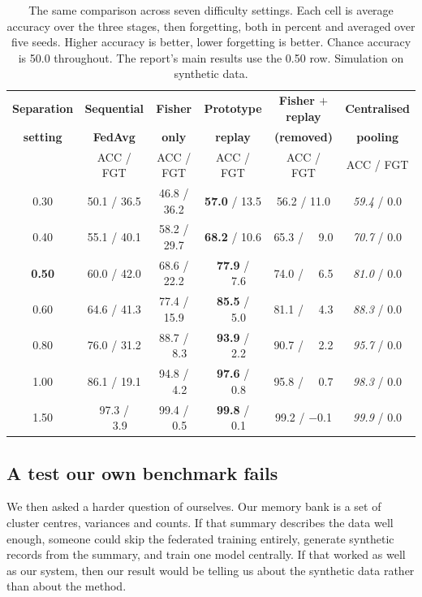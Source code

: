 \documentclass[11pt,a4paper]{article}
\begin{document}
\begin{table}[htbp]
\centering
\caption{The same comparison across seven difficulty settings. Each cell is
average accuracy over the three stages, then forgetting, both in percent and
averaged over five seeds. Higher accuracy is better, lower forgetting is better.
Chance accuracy is 50.0 throughout. The report's main results use the 0.50 row.
Simulation on synthetic data.}
\label{tab:sweep}
\small
\begin{tabular}{@{}c ccccc@{}}
\toprule
\textbf{Separation} & \textbf{Sequential} & \textbf{Fisher} &
\textbf{Prototype} & \textbf{Fisher $+$ replay} & \textbf{Centralised} \\
\textbf{setting} & \textbf{FedAvg} & \textbf{only} & \textbf{replay} &
\textbf{(removed)} & \textbf{pooling} \\
 & ACC / FGT & ACC / FGT & ACC / FGT & ACC / FGT & ACC / FGT \\
\midrule
0.30          & 50.1 / 36.5 & 46.8 / 36.2 & \textbf{57.0} / 13.5 & 56.2 / 11.0 & \textit{59.4} / 0.0 \\
0.40          & 55.1 / 40.1 & 58.2 / 29.7 & \textbf{68.2} / 10.6 & 65.3 / \ \ 9.0 & \textit{70.7} / 0.0 \\
\textbf{0.50} & 60.0 / 42.0 & 68.6 / 22.2 & \textbf{77.9} / \ \ 7.6 & 74.0 / \ \ 6.5 & \textit{81.0} / 0.0 \\
0.60          & 64.6 / 41.3 & 77.4 / 15.9 & \textbf{85.5} / \ \ 5.0 & 81.1 / \ \ 4.3 & \textit{88.3} / 0.0 \\
0.80          & 76.0 / 31.2 & 88.7 / \ \ 8.3 & \textbf{93.9} / \ \ 2.2 & 90.7 / \ \ 2.2 & \textit{95.7} / 0.0 \\
1.00          & 86.1 / 19.1 & 94.8 / \ \ 4.2 & \textbf{97.6} / \ \ 0.8 & 95.8 / \ \ 0.7 & \textit{98.3} / 0.0 \\
1.50          & 97.3 / \ \ 3.9 & 99.4 / \ \ 0.5 & \textbf{99.8} / \ \ 0.1 & 99.2 / $-$0.1 & \textit{99.9} / 0.0 \\
\bottomrule
\end{tabular}
\end{table}

\subsection{A test our own benchmark fails}
\label{sec:probe}

We then asked a harder question of ourselves. Our memory bank is a set of
cluster centres, variances and counts. If that summary describes the data well
enough, someone could skip the federated training entirely, generate synthetic
records from the summary, and train one model centrally. If that worked as well
as our system, then our result would be telling us about the synthetic data
rather than about the method.
\end{document}
